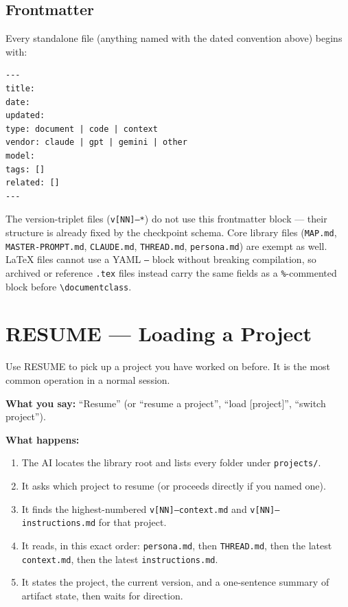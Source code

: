 \documentclass[12pt,letterpaper]{article}
\begin{document}
\subsection{Frontmatter}

Every standalone file (anything named with the dated convention above)
begins with:

\begin{lstlisting}
---
title:
date:
updated:
type: document | code | context
vendor: claude | gpt | gemini | other
model:
tags: []
related: []
---
\end{lstlisting}

The version-triplet files (\texttt{v[NN]--*}) do not use this frontmatter
block --- their structure is already fixed by the checkpoint schema.
Core library files (\texttt{MAP.md}, \texttt{MASTER-PROMPT.md},
\texttt{CLAUDE.md}, \texttt{THREAD.md}, \texttt{persona.md}) are exempt
as well. \LaTeX{} files cannot use a YAML \texttt{---} block without
breaking compilation, so archived or reference \texttt{.tex} files instead
carry the same fields as a \texttt{\%}-commented block before
\texttt{\textbackslash documentclass}.

\section{RESUME --- Loading a Project}

Use RESUME to pick up a project you have worked on before. It is the most
common operation in a normal session.

\begin{mdframed}[style=stepbox]
\textbf{What you say:} ``Resume'' (or ``resume a project'', ``load
[project]'', ``switch project'').

\textbf{What happens:}
\begin{enumerate}
\item The AI locates the library root and lists every folder under
      \texttt{projects/}.
\item It asks which project to resume (or proceeds directly if you named
      one).
\item It finds the highest-numbered \texttt{v[NN]--context.md} and
      \texttt{v[NN]--instructions.md} for that project.
\item It reads, in this exact order: \texttt{persona.md}, then
      \texttt{THREAD.md}, then the latest \texttt{context.md}, then the
      latest \texttt{instructions.md}.
\item It states the project, the current version, and a one-sentence
      summary of artifact state, then waits for direction.
\end{enumerate}
\end{mdframed}
\end{document}
